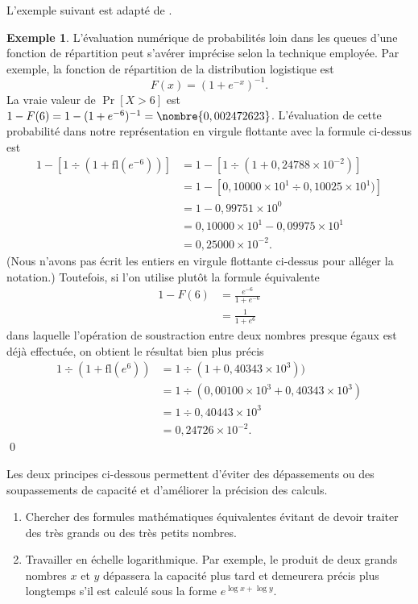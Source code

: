 \documentclass[letterpaper,11pt]{memoir}
\theoremstyle{plain}
\theoremstyle{definition}
\newtheorem{exemple}{Exemple}[chapter]
\theoremstyle{remark}
\newcommand{\fl}{\mathrm{fl}}
\begin{document}
L'exemple suivant est adapté de \cite{Monahan:numstat:2001}.

\begin{exemple}
  L'évaluation numérique de probabilités loin dans les queues d'une
  fonction de répartition peut s'avérer imprécise selon la technique
  employée. Par exemple, la fonction de répartition de la distribution
  logistique est
  \begin{equation*}
    F(x) = (1 + e^{-x})^{-1}.
  \end{equation*}
  La vraie valeur de $\operatorname{Pr}[X > 6]$ est $1 - F(6) = 1 - (1
  + e^{-6})^{-1} = \nombre{0,002472623}$. L'évaluation de cette
  probabilité dans notre représentation en virgule flottante avec la
  formule ci-dessus est
  \begin{align*}
    1 - [1 \div (1 + \fl(e^{-6}))]
    &= 1 - [1 \div (1 + 0,24788 \times 10^{-2})] \\
    &= 1 - [0,10000 \times 10^1 \div 0,10025 \times 10^1)] \\
    &= 1 - 0,99751 \times 10^0 \\
    &= 0,10000 \times 10^1 - 0,09975 \times 10^1 \\
    &= 0,25000 \times 10^{-2}.
  \end{align*}
  (Nous n'avons pas écrit les entiers en virgule flottante ci-dessus
  pour alléger la notation.) Toutefois, si l'on utilise plutôt la
  formule équivalente
  \begin{align*}
    1 - F(6)
    &= \frac{e^{-6}}{1 + e^{-6}} \\
    &= \frac{1}{1 + e^6}
  \end{align*}
  dans laquelle l'opération de soustraction entre deux nombres presque
  égaux est déjà effectuée, on obtient le résultat bien plus précis
  \begin{align*}
    1 \div (1 + \fl(e^6))
    &= 1 \div (1 + 0,40343 \times 10^3)) \\
    &= 1 \div (0,00100 \times 10^3 + 0,40343 \times 10^3) \\
    &= 1 \div 0,40443 \times 10^3 \\
    &= 0,24726 \times 10^{-2}.
  \end{align*}
  \qed
\end{exemple}

Les deux principes ci-dessous permettent d'éviter des dépassements ou
des soupassements de capacité et d'améliorer la précision des calculs.

\begin{enumerate}
\item Chercher des formules mathématiques équivalentes évitant de
  devoir traiter des très grands ou des très petits nombres.
\item Travailler en échelle logarithmique. Par exemple, le produit de
  deux grands nombres $x$ et $y$ dépassera la capacité plus tard et
  demeurera précis plus longtemps s'il est calculé sous la forme
  $e^{\log x + \log y}$.
\end{enumerate}
\end{document}
